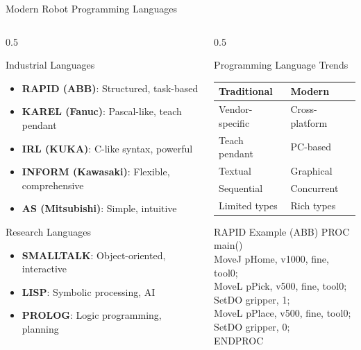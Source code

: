 \documentclass[10pt,aspectratio=169]{beamer}
\begin{document}
\begin{frame}{Modern Robot Programming Languages}
\begin{columns}[T]
\begin{column}{0.5\textwidth}
\begin{block}{Industrial Languages}
\begin{itemize}
\item \textbf{RAPID (ABB)}: Structured, task-based
\item \textbf{KAREL (Fanuc)}: Pascal-like, teach pendant
\item \textbf{IRL (KUKA)}: C-like syntax, powerful
\item \textbf{INFORM (Kawasaki)}: Flexible, comprehensive
\item \textbf{AS (Mitsubishi)}: Simple, intuitive
\end{itemize}
\end{block}
\begin{alertblock}{Research Languages}
\begin{itemize}
\item \textbf{SMALLTALK}: Object-oriented, interactive
\item \textbf{LISP}: Symbolic processing, AI
\item \textbf{PROLOG}: Logic programming, planning
\end{itemize}
\end{alertblock}
\end{column}
\begin{column}{0.5\textwidth}
\begin{block}{Programming Language Trends}
\begin{table}
\centering
\scriptsize
\begin{tabular}{p{}p{}}
\toprule
\textbf{Traditional} & \textbf{Modern} \\
\midrule
Vendor-specific & Cross-platform \\
Teach pendant & PC-based \\
Textual & Graphical \\
Sequential & Concurrent \\
Limited types & Rich types \\
\bottomrule
\end{tabular}
\end{table}
\end{block}
\begin{exampleblock}{RAPID Example (ABB)}
\ttfamily
PROC main()\\
\quad MoveJ pHome, v1000, fine, tool0;\\
\quad MoveL pPick, v500, fine, tool0;\\
\quad SetDO gripper, 1;\\
\quad MoveL pPlace, v500, fine, tool0;\\
\quad SetDO gripper, 0;\\
ENDPROC
\end{exampleblock}
\end{column}
\end{columns}
\end{frame}
\end{document}
